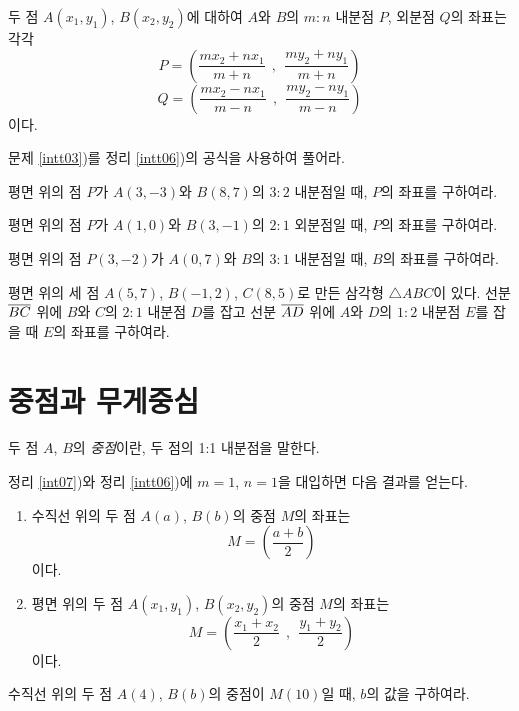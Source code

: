 \documentclass{oblivoir}
\begin{document}
\bigskip
%
\begin{mdframed}
\label{intt06}
두 점 \(A(x_1,y_1)\), \(B(x_2,y_2)\)에 대하여
\(A\)와 \(B\)의 \(m:n\) 내분점 \(P\), 외분점 \(Q\)의 좌표는 각각
\[P=\left(\frac{mx_2+nx_1}{m+n}\:\:,\:\:\frac{my_2+ny_1}{m+n}\right)\]
\[Q=\left(\frac{mx_2-nx_1}{m-n}\:\:,\:\:\frac{my_2-ny_1}{m-n}\right)\]
이다.
\end{mdframed}

%
\prob{}\label{intt07}
문제 \ref{intt03})를 정리 \ref{intt06})의 공식을 사용하여 풀어라.

%
\prob{}\label{intt08}
평면 위의 점 \(P\)가 \(A(3,-3)\)와 \(B(8,7)\)의 \(3:2\) 내분점일 때, \(P\)의 좌표를 구하여라.

%
\prob{}\label{intt09}
평면 위의 점 \(P\)가 \(A(1,0)\)와 \(B(3,-1)\)의 \(2:1\) 외분점일 때, \(P\)의 좌표를 구하여라.

%
\prob{}\label{intt10}
평면 위의 점 \(P(3,-2)\)가 \(A(0,7)\)와 \(B\)의 \(3:1\) 내분점일 때, \(B\)의 좌표를 구하여라.

%
\prob{}\label{intt11}
평면 위의 세 점 \(A(5,7)\), \(B(-1,2)\), \(C(8,5)\)로 만든 삼각형 \(\triangle ABC\)이 있다.
선분 \(\overline{BC}\) 위에 \(B\)와 \(C\)의 \(2:1\) 내분점 \(D\)를 잡고
선분 \(\overline{AD}\) 위에 \(A\)와 \(D\)의 \(1:2\) 내분점 \(E\)를 잡을 때
\(E\)의 좌표를 구하여라.

\section{중점과 무게중심}

두 점 \(A\), \(B\)의 \emph{중점}이란, 두 점의 1:1 내분점을 말한다.

\bigskip
정리 \ref{int07})와 정리 \ref{intt06})에 \(m=1\), \(n=1\)을 대입하면 다음 결과를 얻는다.
%
\begin{mdframed}
\label{mid01}
\begin{enumerate}
\item
수직선 위의 두 점 \(A(a)\), \(B(b)\)의 중점 \(M\)의 좌표는
\[M=\left(\frac{a+b}2\right)\]
이다.
\item
평면 위의 두 점 \(A(x_1,y_1)\), \(B(x_2,y_2)\)의 중점 \(M\)의 좌표는
\[M=\left(\frac{x_1+x_2}2\:\:,\:\:\frac{y_1+y_2}2\right)\]
이다.
\end{enumerate}
\end{mdframed}

%
\prob{}\label{mid02}
수직선 위의 두 점 \(A(4)\), \(B(b)\)의 중점이 \(M(10)\)일 때, \(b\)의 값을 구하여라.
\end{document}
